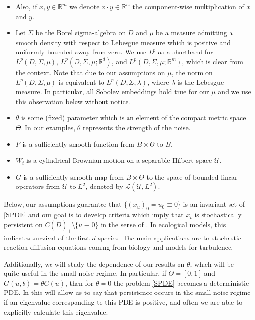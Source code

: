 \documentclass[final]{amsart}
\numberwithin{thm}{section}
\numberwithin{equation}{section}
\newcommand{\U}{\mathcal{U}}
\newcommand{\R}{\mathbb{R}}
\newcommand{\Ll}{\mathcal{L}}
\newcommand{\cdom}{C(\overline D)_+}
\begin{document}
\begin{itemize}
\item
 Also, if $x,y \in \R^m$ we denote $x\cdot y \in \R^m$ the component-wise multiplication of $x$ and $y$. 
    
    \item Let $\Sigma$ be the Borel sigma-algebra on $D$ and $\mu$ be a measure admitting a smooth density with respect to Lebesgue measure which is positive and uniformly bounded away from zero.
    We use $L^p$ as a shorthand for $L^p(D, \Sigma, \mu)$, $L^p(D, \Sigma, \mu;\R^d)$, and $L^p(D, \Sigma, \mu;\R^m)$, which is  clear from the context. Note that due to our assumptions on $\mu$, 
    the norm on $L^p(D, \Sigma, \mu)$ is equivalent to $L^p(D, \Sigma, \lambda)$, where $\lambda$ is the Lebesgue measure. In particular, all Sobolev embeddings hold true for our $\mu$ and we use this observation below without notice. 
    \item $\theta$ is some (fixed) parameter which is an element of the compact metric space $\Theta$. In our examples, $\theta$ represents the strength of the noise.
    
    
  
    
    
    \item $F$ is a sufficiently smooth function from $B \times \Theta$ to $B$.
    \item $W_t$ is a cylindrical Brownian motion on a separable Hilbert space $\U$.
    
    \item $G$ is a sufficiently smooth map from $B \times \Theta$ to the space of bounded linear operators from $\U$ to $L^2$, denoted by $\Ll(\U,L^2)$.
\end{itemize}


Below, our assumptions guarantee that $\{(x_u)_0 = u_0 \equiv 0\}$ is an invariant set of \eqref{SPDE} and our goal is to develop criteria which imply that $x_t$ is stochastically persistent on $\cdom \setminus \{u \equiv 0\}$ in the sense of . In ecological models, this indicates survival of the first $d$ species. The main applications are to stochastic reaction-diffusion equations coming from biology and models for turbulence.

Additionally, we will study the dependence of our results on $\theta$, which will be quite useful in the small noise regime. In particular, if $\Theta = [0,1]$ and $G(u,\theta) = \theta G(u)$, then for $\theta = 0$ the problem \eqref{SPDE} becomes a deterministic PDE. In  this will allow us to say that persistence occurs in the small noise regime if an eigenvalue corresponding to this PDE is positive, and often we are able to explicitly calculate this eigenvalue.
\end{document}
